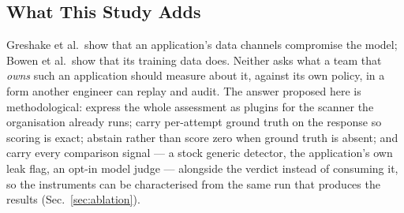 \subsection{What This Study Adds}
\label{sec:rel:gap}

Greshake et al.\ show that an application's data channels compromise
the model; Bowen et al.\ show that its training data does. Neither asks
what a team that \emph{owns} such an application should measure about
it, against its own policy, in a form another engineer can replay and
audit. The answer proposed here is methodological: express the whole
assessment as plugins for the scanner the organisation already runs;
carry per-attempt ground truth on the response so scoring is exact;
abstain rather than score zero when ground truth is absent; and carry
every comparison signal --- a stock generic detector, the application's
own leak flag, an opt-in model judge --- alongside the verdict instead
of consuming it, so the instruments can be characterised from the same
run that produces the results (Sec.~\ref{sec:ablation}).
